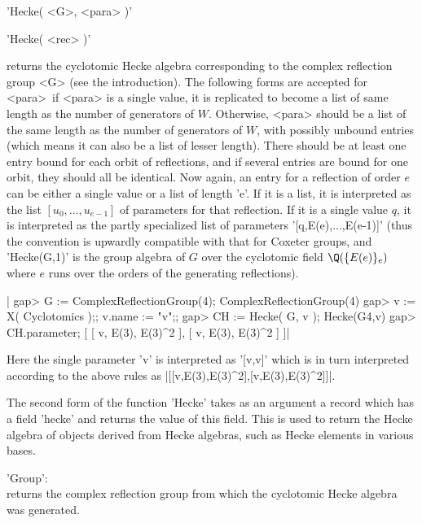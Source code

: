 
'Hecke( <G>, <para> )'

'Hecke( <rec> )'

returns   the  cyclotomic  Hecke  algebra   corresponding  to  the  complex
reflection  group  <G>  (see  the  introduction).  The  following forms are
accepted  for <para>\:\ if  <para> is a  single value, it  is replicated to
become a list of same length as the number of generators of $W$. Otherwise,
<para>  should be a list of the same  length as the number of generators of
$W$,  with possibly unbound entries  (which means it can  also be a list of
lesser  length). There should be at least one entry bound for each orbit of
reflections,  and if several  entries are bound  for one orbit, they should
all  be identical. Now again, an entry for a reflection of order $e$ can be
either  a single  value or  a list  of length  'e'. If  it is a list, it is
interpreted  as  the  list  $[u_0,\ldots,u_{e-1}]$  of  parameters for that
reflection.  If it is a  single value $q$, it  is interpreted as the partly
specialized  list of parameters  '[q,E(e),...,E(e-1)]' (thus the convention
is  upwardly compatible with  that for Coxeter  groups, and 'Hecke(G,1)' is
the  group algebra of $G$ over  the cyclotomic field $\Q(\{E(e)\}_e)$ where
$e$ runs over the orders of the generating reflections).

|    gap> G := ComplexReflectionGroup(4);
    ComplexReflectionGroup(4)
    gap> v := X( Cyclotomics );; v.name := "v";;
    gap> CH := Hecke( G, v );
    Hecke(G4,v)
    gap> CH.parameter;
    [ [ v, E(3), E(3)^2 ], [ v, E(3), E(3)^2 ] ]|


Here  the  single   parameter  'v'  is  interpreted   as  '[v,v]'  which
is   in   turn   interpreted   according   to   the   above   rules   as
|[[v,E(3),E(3)^2],[v,E(3),E(3)^2]]|.

The second  form of the function  'Hecke' takes as an  argument a record
which has a field  'hecke' and returns the value of  this field. This is
used to return the Hecke algebra of objects derived from Hecke algebras,
such as Hecke elements in various bases.


'Group':\\ returns the complex reflection group from which the cyclotomic
     Hecke algebra was generated.

